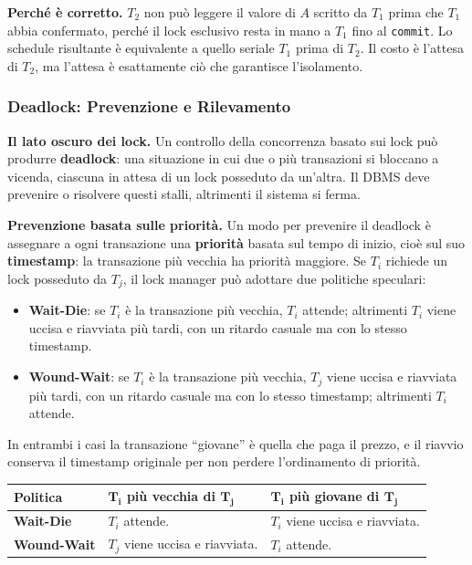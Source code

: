 \documentclass[12pt]{extarticle}
\begin{document}
\noindent \textbf{Perché è corretto.} $T_2$ non può leggere il valore di $A$ scritto da $T_1$ prima che $T_1$ abbia confermato, perché il lock esclusivo resta in mano a $T_1$ fino al \texttt{commit}. Lo schedule risultante è equivalente a quello seriale $T_1$ prima di $T_2$. Il costo è l'attesa di $T_2$, ma l'attesa è esattamente ciò che garantisce l'isolamento.

\subsubsection{Deadlock: Prevenzione e Rilevamento}

\noindent \textbf{Il lato oscuro dei lock.} Un controllo della concorrenza basato sui lock può produrre \textbf{deadlock}: una situazione in cui due o più transazioni si bloccano a vicenda, ciascuna in attesa di un lock posseduto da un'altra. Il DBMS deve prevenire o risolvere questi stalli, altrimenti il sistema si ferma.

\medskip
\noindent \textbf{Prevenzione basata sulle priorità.} Un modo per prevenire il deadlock è assegnare a ogni transazione una \textbf{priorità} basata sul tempo di inizio, cioè sul suo \textbf{timestamp}: la transazione più vecchia ha priorità maggiore. Se $T_i$ richiede un lock posseduto da $T_j$, il lock manager può adottare due politiche speculari:
\begin{itemize}
    \item \textbf{Wait-Die}: se $T_i$ è la transazione più vecchia, $T_i$ attende; altrimenti $T_i$ viene uccisa e riavviata più tardi, con un ritardo casuale ma con lo stesso timestamp.
    \item \textbf{Wound-Wait}: se $T_i$ è la transazione più vecchia, $T_j$ viene uccisa e riavviata più tardi, con un ritardo casuale ma con lo stesso timestamp; altrimenti $T_i$ attende.
\end{itemize}
In entrambi i casi la transazione ``giovane'' è quella che paga il prezzo, e il riavvio conserva il timestamp originale per non perdere l'ordinamento di priorità.

\begin{center}
\small
\begin{tabular}{@{}lp{5.4cm}p{5.4cm}@{}}
    \toprule
    \textbf{Politica} & $\boldsymbol{T_i}$ \textbf{più vecchia di} $\boldsymbol{T_j}$ & $\boldsymbol{T_i}$ \textbf{più giovane di} $\boldsymbol{T_j}$ \\
    \midrule
    \textbf{Wait-Die} & $T_i$ attende. & $T_i$ viene uccisa e riavviata. \\
    \addlinespace
    \textbf{Wound-Wait} & $T_j$ viene uccisa e riavviata. & $T_i$ attende. \\
    \bottomrule
\end{tabular}
\end{center}
\end{document}
